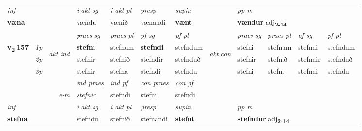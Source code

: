 \begin{longtable}[l]{X>{\footnotesize\itshape}llXXXXlXXXX}
\cmidrule{4-7}
   {\textit{inf}} & &  & \textit{i akt sg} & \textit{i akt pl}   & \textit{presp} & \textit{supin}  && \textit{pp m} \\*
  {\textbf{væna}} & && vændu  & vænið   & vænandi &  \textbf{vænt}  && \multicolumn{2}{l}{\textbf{vændur} adj\textbf{\textsubscript{2-14}}} \\*

\midrule

 & &   & \textit{praes sg}  & \textit{praes pl}    & \textit{ pf sg} & \textit{pf pl} & & \textit{praes sg}  & \textit{praes pl}    & \textit{pf sg} & \textit{pf pl }  \\ \cmidrule{4-7} \cmidrule{9-12}
 \multirow{2}{*}{{{\textbf{v{\textsubscript{2}}} \Large{\textbf{157}}}}}  & 1p & \multirow{3}{*}{\begin{turn}{90}\textit{akt ind}\end{turn}} & \textbf{stefni} & stefnum & \textbf{stefndi} & stefndum & \multirow{3}{*}{\begin{turn}{90}\textit{akt con}\end{turn}} &stefni & stefnum & stefndi & stefndum\\*
 & 2p &  &  stefnir  & stefnið & stefndir & stefnduð & & stefnir & stefnið & stefndir & stefnduð \\*
 & 3p &  & stefnir & stefna & stefndi & stefndu & & stefni & stefni& stefndi & stefndu \\*
\cmidrule{4-7} \cmidrule{9-12}

   && &  \textit{ind praes} & \textit{ind pf} & \textit{con praes} & \textit{con pf} \\*
\multicolumn{3}{r}{\textit{e-m}} & stefnir & stefndi & stefni & stefndi \\*

\cmidrule{4-7}
   {\textit{inf}} & &  & \textit{i akt sg} & \textit{i akt pl}   & \textit{presp} & \textit{supin}  && \textit{pp m} \\*
  {\textbf{stefna}} & && stefndu  & stefnið   & stefnandi &  \textbf{stefnt}  && \multicolumn{2}{l}{\textbf{stefndur} adj\textbf{\textsubscript{2-14}}} \\*

\midrule


\end{longtable}

